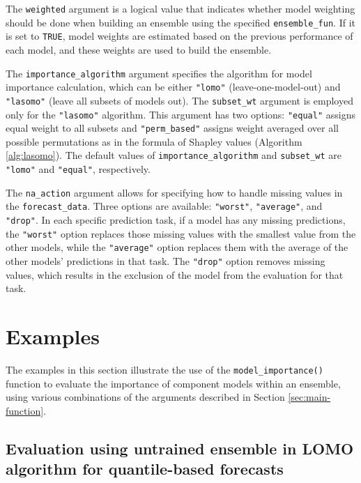 \documentclass[
  article,
  shortnames,
  notitle]{jss}
\begin{document}
The \texttt{weighted} argument is a logical value that indicates whether
model weighting should be done when building an ensemble using the
specified \texttt{ensemble\_fun}. If it is set to \texttt{TRUE}, model
weights are estimated based on the previous performance of each model,
and these weights are used to build the ensemble.

The \texttt{importance\_algorithm} argument specifies the algorithm for
model importance calculation, which can be either \texttt{"lomo"}
(leave-one-model-out) and \texttt{"lasomo"} (leave all subsets of models
out). The \texttt{subset\_wt} argument is employed only for the
\texttt{"lasomo"} algorithm. This argument has two options:
\texttt{"equal"} assigns equal weight to all subsets and
\texttt{"perm\_based"} assigns weight averaged over all possible
permutations as in the formula of Shapley values (Algorithm
\ref{alg:lasomo}). The default values of \texttt{importance\_algorithm}
and \texttt{subset\_wt} are \texttt{"lomo"} and \texttt{"equal"},
respectively.

The \texttt{na\_action} argument allows for specifying how to handle
missing values in the \texttt{forecast\_data}. Three options are
available: \texttt{"worst"}, \texttt{"average"}, and \texttt{"drop"}. In
each specific prediction task, if a model has any missing predictions,
the \texttt{"worst"} option replaces those missing values with the
smallest value from the other models, while the \texttt{"average"}
option replaces them with the average of the other models' predictions
in that task. The \texttt{"drop"} option removes missing values, which
results in the exclusion of the model from the evaluation for that task.

\section{Examples}\label{sec:examples}

The examples in this section illustrate the use of the
\texttt{model\_importance()} function to evaluate the importance of
component models within an ensemble, using various combinations of the
arguments described in Section \ref{sec:main-function}.

\subsection{Evaluation using untrained ensemble in LOMO algorithm for
quantile-based forecasts}\label{sec:untrained-lomo-qntl}
\end{document}
